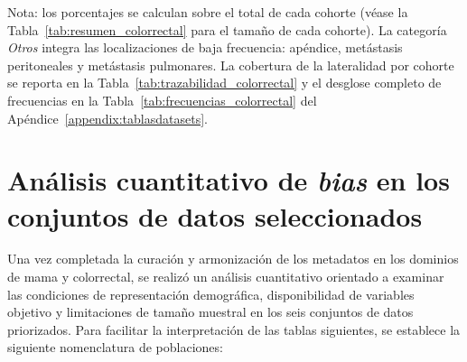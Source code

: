 \begin{table}[htbp]
\centering
\caption{Variables objetivo del dominio colorrectal: categorías retenidas y clases minoritarias tras la curación.}
\label{tab:resumen_frecuencias_colorrectal}
\small
{}

\vspace{4pt}
Nota: los porcentajes se calculan sobre el total de cada cohorte (véase la Tabla~\ref{tab:resumen_colorrectal} para el tamaño de cada cohorte). La categoría \textit{Otros} integra las localizaciones de baja frecuencia: apéndice, metástasis peritoneales y metástasis pulmonares. La cobertura de la lateralidad por cohorte se reporta en la Tabla~\ref{tab:trazabilidad_colorrectal} y el desglose completo de frecuencias en la Tabla~\ref{tab:frecuencias_colorrectal} del Apéndice~\ref{appendix:tablasdatasets}.
\end{table}


\section{Análisis cuantitativo de \textit{bias} en los conjuntos de datos seleccionados}
\label{sec:analisis_cuantitativo_bias}

Una vez completada la curación y armonización de los metadatos en los dominios de mama y colorrectal, se realizó un análisis cuantitativo orientado a examinar las condiciones de representación demográfica, disponibilidad de variables objetivo y limitaciones de tamaño muestral en los seis conjuntos de datos priorizados. Para facilitar la interpretación de las tablas siguientes, se establece la siguiente nomenclatura de poblaciones:

